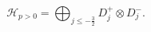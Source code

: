 \begin{equation}
\mathcal{H}_{p>0} = \bigoplus_{j\leq -\frac{3}{2}} D^+_j \otimes D^-_j.
\end{equation}

